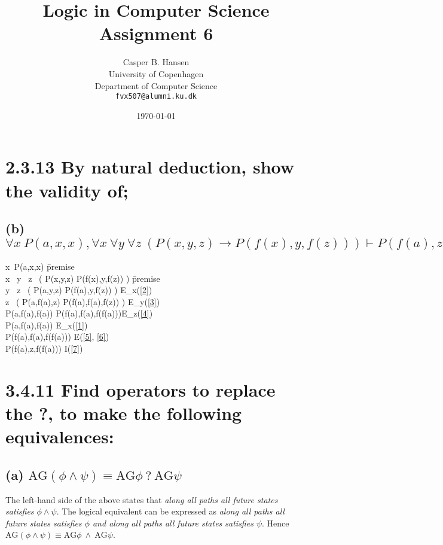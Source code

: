 \documentclass[11pt,a4paper]{article}
\title
{
{\Large Logic in Computer Science}\\
Assignment 6
}
\author
{
	Casper B. Hansen\\
	University of Copenhagen\\
	Department of Computer Science\\
	{\tt fvx507@alumni.ku.dk}
}
\date{\today}
\def\intro#1{{#1}{\cal I}}
\def\elim#1{{#1}{\cal E}}
\let\imp\to
\def\elim#1{{{#1}{\cal E}}}
\def\intro#1{{{#1}{\cal I}}}
\begin{document}
\maketitle


\section*{2.3.13 \mdseries By natural deduction, show the validity of;}
\subsection*{(b) \mdseries $\forall x{\ }P(a,x,x), \forall x{\ }\forall y{\ }
\forall z{\ }( P(x,y,z) \imp P(f(x),y,f(z)) ) \vdash P(f(a),z,f(f(a)))$}
\begin{proofbox}
	 \:	\forall x{\ }P(a,x,x)					\=\mbox{premise} \\
	 \:	\forall x{\ }
				\forall y{\ }
				\forall z{\ }
				( P(x,y,z) \imp P(f(x),y,f(z)) )		\=\mbox{premise} \\
	 \:	\forall y{\ }
				\forall z{\ }
				( P(a,y,z) \imp P(f(a),y,f(z)) )		\=\elim\forall_x(\ref{2}) \\
	 \:	\forall z{\ }
				( P(a,f(a),z) \imp P(f(a),f(a),f(z)) )	\=\elim\forall_y(\ref{3}) \\
	 \:	P(a,f(a),f(a)) \imp P(f(a),f(a),f(f(a)))\=\elim\forall_z(\ref{4}) \\
	 \:	P(a,f(a),f(a))							\=\elim\forall_x(\ref{1}) \\
	 \:	P(f(a),f(a),f(f(a)))					\=\elim\imp(\ref{5}, \ref{6}) \\
	 \:	\exists P(f(a),z,f(f(a)))				\=\intro\exists(\ref{7}) \\
\end{proofbox}

\section*{3.4.11 \mdseries Find operators to replace the ?, to make the
following equivalences:}
\subsection*{(a) \mdseries $\text{AG}(\phi \land \psi) \equiv \text{AG}
\phi{\ }?{\ }\text{AG} \psi$}
The left-hand side of the above states that {\it along all paths all future
states satisfies $\phi \land \psi$}. The logical equivalent can be expressed
as {\it along all paths all future states satisfies $\phi$ and along all paths
all future states satisfies $\psi$}. Hence $\text{AG}(\phi \land \psi) \equiv \text{AG}
\phi{\ }\land{\ }\text{AG} \psi$.
\end{document}
